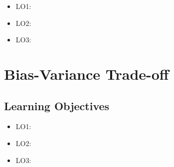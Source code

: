 \documentclass[12pt,]{krantz}
\providecommand{\tightlist}{%
  \setlength{\itemsep}{0pt}\setlength{\parskip}{0pt}}
\begin{document}
\begin{itemize}
\tightlist
\item
  LO1:
\item
  LO2:
\item
  LO3:
\end{itemize}

\hypertarget{chap-bias-variance}{%
\section{Bias-Variance Trade-off}\label{chap-bias-variance}}

\hypertarget{learning-objectives-9}{%
\subsection*{Learning Objectives}\label{learning-objectives-9}}

\begin{itemize}
\tightlist
\item
  LO1:
\item
  LO2:
\item
  LO3:
\end{itemize}


\end{document}

